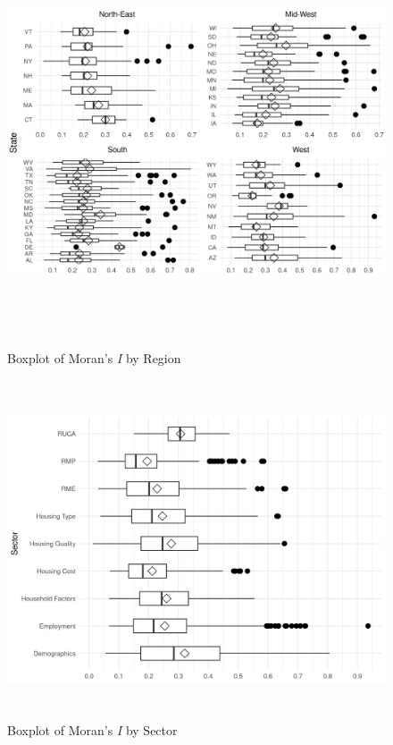 \begin{figure}[htbp]
    \centering
     \includegraphics[width=1\textwidth, height=12cm]{plots/moran_state.png}
     \caption{Boxplot of Moran's {\itshape I} by Region}
     \label{fig:moran_region}
 \end{figure}

 \begin{figure}[htbp]
    \centering
     \includegraphics[width=1\textwidth, height=10cm]{plots/moran_sector}
     \caption{Boxplot of Moran's {\itshape I} by Sector}
     \label{fig:moran_sector}
 \end{figure}




